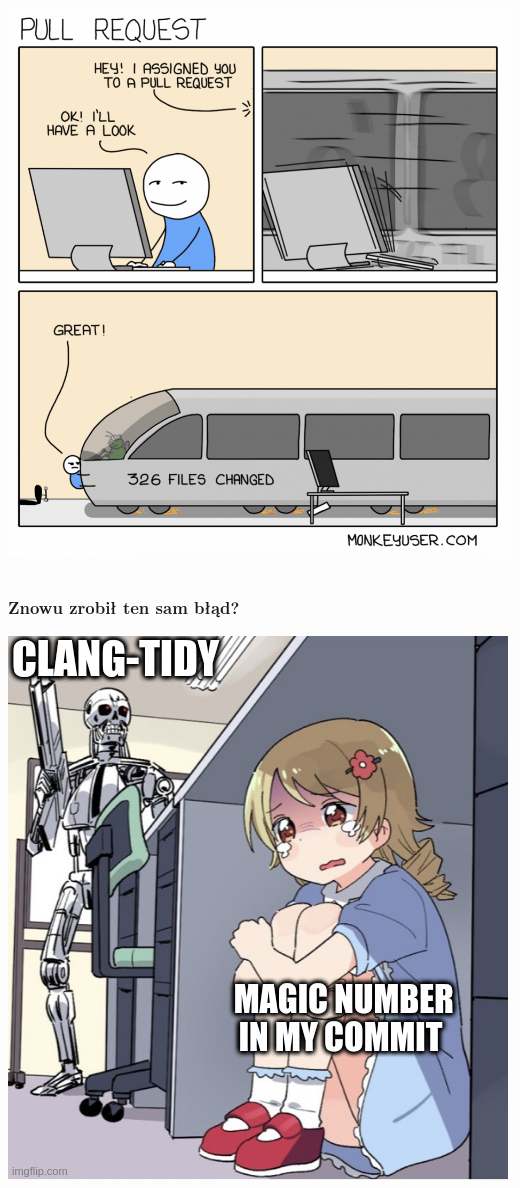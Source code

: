 \documentclass[xcolor=dvipsnames]{beamer}%
\begin{document}
\begin{frame}
\begin{columns}
\begin{column}{0.5\textwidth}
			\includegraphics[width=\textwidth,height=\textheight,keepaspectratio]{figure/za_duzo.png}
		\end{column}
	\end{columns}
\end{frame}

\begin{frame}
	\frametitle{Znowu zrobił ten sam błąd?}
	\centering \includegraphics[width=\textwidth,height=0.85\textheight,keepaspectratio]{figure/automat.jpg}
\end{frame}
\end{document}
